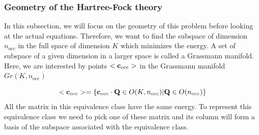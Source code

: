 \documentclass[11pt,a4paper]{article}
\newcommand{\occ}{\text{occ}}
\begin{document}

\subsubsection{Geometry of the Hartree-Fock theory}
\label{sec:geomHF}

In this subsection, we will focus on the geometry of this problem before looking at the actual equations.
Therefore, we want to find the subspace of dimension $n_\occ$ in the full space of dimension $K$ which minimizes the energy.
A set of subspace of a given dimension in a larger space is called a Grassmann manifold. Here, we are interested by points $<\vb{c}_\occ>$ in the Grassmann manifold $Gr(K,n_\occ)$

\begin{equation}
  \label{eq:HF_PointGrassmannManifold}
 <\vb{c}_\occ> = \{ \vb{c}_\occ \cdot \vb{Q} \in O(K,n_\occ) | \vb{Q} \in O(n_\occ) \}
\end{equation}
All the matrix in this equivalence class have the same energy. To represent this equivalence class we need to pick one of these matrix and its column will form a basis of the subspace associated with the equivalence class.
\end{document}
